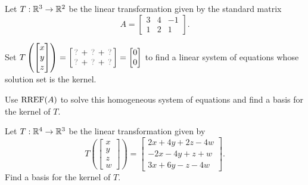\begin{activity}{10}
Let $T: \mathbb{R}^3 \rightarrow \mathbb{R}^2$ be the linear transformation given by the
standard matrix
\[A=\begin{bmatrix} 3 & 4 & -1 \\ 1 & 2 & 1 \end{bmatrix}.\]
\begin{subactivity}
Set
\(
  T\left(\begin{bmatrix}x\\y\\z\end{bmatrix}\right)
    =
  \begin{bmatrix}
    \unknown+\unknown+\unknown \\
    \unknown+\unknown+\unknown
  \end{bmatrix}
    =
  \begin{bmatrix}0\\0\end{bmatrix}
\) to find a linear system of equations whose solution set is the kernel.
\end{subactivity}
\begin{subactivity}
Use $\operatorname{RREF}(A)$ to solve this homogeneous system of equations and find a basis
for the kernel of \(T\).
\end{subactivity}
\end{activity}

\begin{activity}{10}
Let \(T: \mathbb{R}^4 \rightarrow \mathbb{R}^3\) be the linear transformation given by 
\[ T\left(\begin{bmatrix} x \\ y \\ z \\ w \end{bmatrix} \right) = 
\begin{bmatrix} 2x+4y+2z-4w \\ -2x-4y+z+w \\ 3x+6y-z-4w\end{bmatrix}.\]
\vfill
Find a basis for the kernel of \(T\).
\end{activity}

